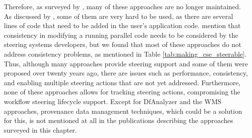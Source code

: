 Therefore, as surveyed by \citet{Bauer2016In}, many of these approaches are no
longer maintained.
As discussed by \citet{Figueira2004CS_LITE:}, some of them are very hard to be used,
as there are several lines of code that need to be added in the user's
application code.
\citet{Hart1999Consistency}
mention that consistency in modifying a running parallel code needs to
be considered by the steering systems developers, but we found that most
of these approaches do not address consistency problems, as mentioned in
Table \ref{tab:making_cse_steerable}.
Thus, although many approaches provide steering support and some
of them were proposed over twenty years ago, there are issues such as performance, consistency, and enabling multiple
steering actions that are not yet addressed.
Furthermore, none of these approaches allows for tracking steering actions, compromising the workflow steering lifecycle support. Except for DfAnalyzer and the WMS approaches, provenance data management techniques, which could be a solution for this, is not mentioned at all in the publications describing the approaches surveyed in this chapter.
